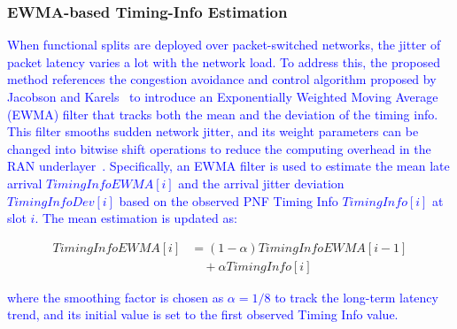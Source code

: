 \documentclass[10pt, conference, letterpaper]{IEEEtran}
\begin{document}
\subsubsection{EWMA-based Timing-Info Estimation}
\textcolor{blue}{When functional splits are deployed over packet-switched networks, the jitter of packet latency varies a lot with the network load. To address this, the proposed method references the congestion avoidance and control algorithm proposed by Jacobson and Karels~\cite{jacobson1988congestion} to introduce an Exponentially Weighted Moving Average (EWMA) filter that tracks both the mean and the deviation of the timing info. This filter smooths sudden network jitter, and its weight parameters can be changed into bitwise shift operations to reduce the computing overhead in the RAN underlayer~\cite{jacobson1988congestion}. Specifically, an EWMA filter is used to estimate the mean late arrival $\mathit{TimingInfoEWMA}[i]$ and the arrival jitter deviation $\mathit{TimingInfoDev}[i]$ based on the observed PNF Timing Info $\mathit{TimingInfo}[i]$ at slot $i$. The mean estimation is updated as:}
\begin{small}
\begin{equation}
\begin{split}
\mathit{TimingInfoEWMA}[i] & = (1 - \alpha) \mathit{TimingInfoEWMA}[i-1] \\
& \quad + \alpha \mathit{TimingInfo}[i]
\end{split}
\end{equation}
\end{small}
\textcolor{blue}{where the smoothing factor is chosen as $\alpha = 1/8$ to track the long-term latency trend, and its initial value is set to the first observed Timing Info value.}
\end{document}
